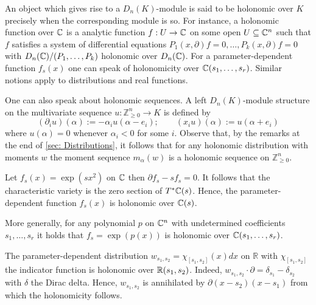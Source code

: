 An object which gives rise to a $D_n(K)$-module is said to be holonomic over $K$ precisely when the corresponding module is so.
For instance, a holonomic function over $\mathbb{C}$ is a analytic function $f:U\to \mathbb{C}$ on some open $U\subseteq \mathbb{C}^n$ such that $f$ satisfies a system of differential equations $P_{1}(x,\partial)f = 0,\ldots, P_{k}(x,\partial)f=0$ with $D_n(\mathbb{C})/(P_1,\ldots,P_k)$ holonomic over $D_n(\mathbb{C})$.
For a parameter-dependent function $f_s(x)$ one can speak of holonomicity over $\mathbb{C}(s_1,\ldots,s_r)$.
Similar notions apply to distributions and real functions.

One can also speak about holonomic sequences.
A left $D_n(K)$-module structure on the multivariate sequence $u:\mathbb{Z}_{\geq 0}^n \to K$ is defined by
$$( \partial_iu)(\alpha) := -\alpha_i u(\alpha-e_i); \qquad (x_iu)(\alpha):= u(\alpha + e_i)$$
where $u(\alpha) = 0$ whenever $\alpha_i<0$ for some $i$.
Observe that, by the remarks at the end of \cref{sec: Distributions}, it follows that for any holonomic distribution with moments $w$ the moment sequence $m_\alpha(w)$ is a holonomic sequence on $\mathbb{Z}_{\geq 0}^n$.
\begin{example}
  Let $f_s(x) = \exp(sx^2)$ on $\mathbb{C}$ then  $\partial f_s - sf_s = 0$.
  It follows that the characteristic variety is the zero section of $T^*\mathbb{C}(s)$.
  Hence, the parameter-dependent function $f_s(x)$ is holonomic over $\mathbb{C}(s)$.

  More generally, for any polynomial $p$ on $\mathbb{C}^n$ with undetermined coefficients $s_1,\ldots,s_r$ it holds that $f_s = \exp(p(x))$ is holonomic over $\mathbb{C}(s_1,\ldots,s_r)$.
\end{example}
\begin{example}\label{ex: Indicator}
  The parameter-dependent distribution $w_{s_1,s_2} = \chi_{[s_1,s_2]}(x)dx$ on $\mathbb{R}$ with $\chi_{[s_1,s_2]}$ the indicator function is holonomic over $\mathbb{R}(s_1,s_2)$.
  Indeed, $w_{s_1,s_2}\cdot \partial = \delta_{s_1} -\delta_{s_2}$ with $\delta$ the Dirac delta.
  Hence, $w_{s_1,s_2}$ is annihilated by $\partial(x-s_2)(x-s_1)$ from which the holonomicity follows.
\end{example}

